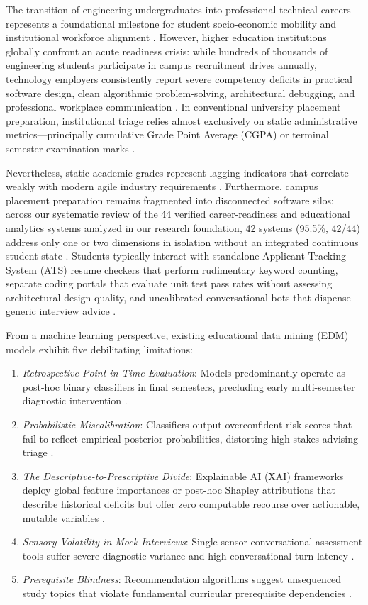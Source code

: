 \documentclass[conference]{IEEEtran}
\begin{document}
The transition of engineering undergraduates into professional technical careers represents a foundational milestone for student socio-economic mobility and institutional workforce alignment \cite{b1}. However, higher education institutions globally confront an acute readiness crisis: while hundreds of thousands of engineering students participate in campus recruitment drives annually, technology employers consistently report severe competency deficits in practical software design, clean algorithmic problem-solving, architectural debugging, and professional workplace communication \cite{b2}. In conventional university placement preparation, institutional triage relies almost exclusively on static administrative metrics---principally cumulative Grade Point Average (CGPA) or terminal semester examination marks \cite{b3}.

Nevertheless, static academic grades represent lagging indicators that correlate weakly with modern agile industry requirements \cite{b4}. Furthermore, campus placement preparation remains fragmented into disconnected software silos: across our systematic review of the 44 verified career-readiness and educational analytics systems analyzed in our research foundation, 42 systems (95.5\%, 42/44) address only one or two dimensions in isolation without an integrated continuous student state \cite{b6}. Students typically interact with standalone Applicant Tracking System (ATS) resume checkers that perform rudimentary keyword counting, separate coding portals that evaluate unit test pass rates without assessing architectural design quality, and uncalibrated conversational bots that dispense generic interview advice \cite{b3,b5}. 

From a machine learning perspective, existing educational data mining (EDM) models exhibit five debilitating limitations:
\begin{enumerate}
\item \textit{Retrospective Point-in-Time Evaluation}: Models predominantly operate as post-hoc binary classifiers in final semesters, precluding early multi-semester diagnostic intervention \cite{b6,b7}.
\item \textit{Probabilistic Miscalibration}: Classifiers output overconfident risk scores that fail to reflect empirical posterior probabilities, distorting high-stakes advising triage \cite{b8}.
\item \textit{The Descriptive-to-Prescriptive Divide}: Explainable AI (XAI) frameworks deploy global feature importances or post-hoc Shapley attributions that describe historical deficits but offer zero computable recourse over actionable, mutable variables \cite{b16,b17}.
\item \textit{Sensory Volatility in Mock Interviews}: Single-sensor conversational assessment tools suffer severe diagnostic variance and high conversational turn latency \cite{b12,b13,b19}.
\item \textit{Prerequisite Blindness}: Recommendation algorithms suggest unsequenced study topics that violate fundamental curricular prerequisite dependencies \cite{b14,b20}.
\end{enumerate}
\end{document}
